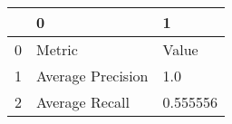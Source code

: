 \begin{tabular}{lll}
\toprule
{} &                  0 &         1 \\
\midrule
0 &             Metric &     Value \\
1 &  Average Precision &       1.0 \\
2 &     Average Recall &  0.555556 \\
\bottomrule
\end{tabular}
